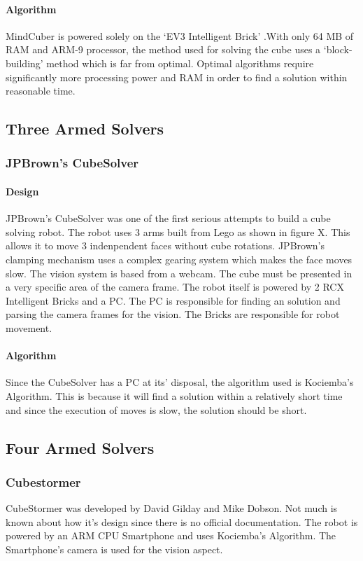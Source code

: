 \documentclass[titlepage]{report}[12pt]
\begin{document}
\paragraph{Algorithm}
MindCuber is powered solely on the `EV3 Intelligent Brick' .With only 64 MB of RAM and ARM-9 processor, the method used for solving the cube uses a `block-building' method which is far from optimal. Optimal algorithms require significantly more processing power and RAM in order to find a solution within reasonable time.

\subsection{Three Armed Solvers}
\subsubsection{JPBrown's CubeSolver}
\paragraph{Design}
JPBrown's CubeSolver was one of the first serious attempts to build a cube solving robot. The robot uses 3 arms built from Lego as shown in figure X. This allows it to move 3 indenpendent faces without cube rotations. JPBrown's clamping mechanism uses a complex gearing system which makes the face moves slow. The vision system is based from a webcam. The cube must be presented in a very specific area of the camera frame. The robot itself is powered by 2 RCX Intelligent Bricks and a PC. The PC is responsible for finding an solution and parsing the camera frames for the vision. The Bricks are responsible for robot movement.

\paragraph{Algorithm}
Since the CubeSolver has a PC at its' disposal, the algorithm used is Kociemba's Algorithm. This is because it will find a solution within a relatively short time and since the execution of moves is slow, the solution should be short.

\subsection{Four Armed Solvers}
\subsubsection{Cubestormer}
CubeStormer was developed by David Gilday and Mike Dobson. Not much is known about how it's design since there is no official documentation. The robot is powered by an ARM CPU Smartphone and uses Kociemba's Algorithm. The Smartphone's camera is used for the vision aspect.
\end{document}
